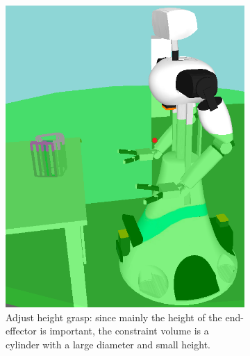 \begin{figure}[ht]
	\begin{subfigure}[t]{0.3\linewidth}
		\centering
		\includegraphics[width = 1\linewidth]{pics/TopologicalHeight_emphsphere}
		\caption{Adjust height grasp: since mainly the height of the end-effector is important, the constraint volume is a cylinder with a large diameter and small height.}
		\label{wbp:fig:topheight}
	\end{subfigure}
	\hfill
	\begin{subfigure}[t]{0.3\linewidth}
		\centering

\end{subfigure}
\end{figure}
